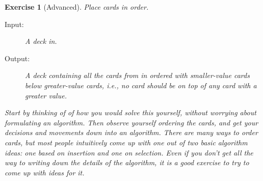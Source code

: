 \documentclass[a4paper,twoside]{tufte-handout}
\newtheorem{exercise}{Exercise}
\begin{document}
\begin{exercise}[Advanced]
  Place cards in order.
  \begin{description}
  \item[Input:] A deck \emph{in}.
  \item[Output:] A deck containing all the cards from
    \emph{in} ordered with smaller-value cards below greater-value
    cards, i.e., no card should be on top of any card with a greater
    value.
 \end{description}
    
 Start by thinking of of how you would solve this yourself, without
 worrying about formulating an algorithm. Then observe yourself
 ordering the cards, and get your decisions and movements down into an
 algorithm. There are many ways to order cards, but most people
 intuitively come up with one out of two basic algorithm ideas: one
 based on \emph{insertion} and one on \emph{selection}. Even if you
 don't get all the way to writing down the details of the algorithm,
 it is a good exercise to try to come up with ideas for it.
\end{exercise}
\end{document}
